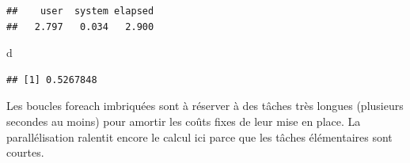 \documentclass[
  11pt,
  french,
  a4paper,
  extrafontsizes,onecolumn,openright
  ]{memoir}
\newenvironment{Shaded}{\begin{snugshade}}{\end{snugshade}}
\newcommand{\AttributeTok}[1]{\textcolor[rgb]{0.77,0.63,0.00}{#1}}
\newcommand{\ControlFlowTok}[1]{\textcolor[rgb]{0.13,0.29,0.53}{\textbf{#1}}}
\newcommand{\DecValTok}[1]{\textcolor[rgb]{0.00,0.00,0.81}{#1}}
\newcommand{\FunctionTok}[1]{\textcolor[rgb]{0.00,0.00,0.00}{#1}}
\newcommand{\NormalTok}[1]{#1}
\newcommand{\OtherTok}[1]{\textcolor[rgb]{0.56,0.35,0.01}{#1}}
\newcommand{\SpecialCharTok}[1]{\textcolor[rgb]{0.00,0.00,0.00}{#1}}
\newcommand{\StringTok}[1]{\textcolor[rgb]{0.31,0.60,0.02}{#1}}
\begin{document}
\begin{verbatim}
##    user  system elapsed 
##   2.797   0.034   2.900
\end{verbatim}

\begin{Shaded}
\begin{Highlighting}[]
\NormalTok{d}
\end{Highlighting}
\end{Shaded}

\begin{verbatim}
## [1] 0.5267848
\end{verbatim}

\normalsize

Les boucles foreach imbriquées sont à réserver à des tâches très longues (plusieurs secondes au moins) pour amortir les coûts fixes de leur mise en place.
La parallélisation ralentit encore le calcul ici parce que les tâches élémentaires sont courtes.

\scriptsize

\begin{Shaded}
\end{Shaded}
\end{document}
